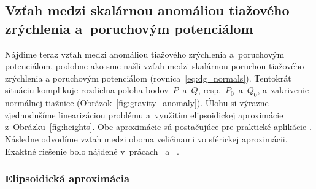 \documentclass[a4paper, 12pt]{book}
\begin{document}
\subsection{Vzťah medzi skalárnou anomáliou tiažového zrýchlenia a~poruchovým 
potenciálom}

Nájdime teraz vzťah medzi anomáliou tiažového zrýchlenia a~poruchovým 
potenciálom, podobne ako sme našli vzťah medzi skalárnou poruchou tiažového 
zrýchlenia a poruchovým potenciálom (rovnica~\ref{eq:dg_normals}).  Tentokrát 
situáciu komplikuje rozdielna poloha bodov~$P$~a~$Q$, resp.~$P_0$~a~$Q_0$, 
a~zakrivenie normálnej tiažnice (Obrázok~\ref{fig:gravity_anomaly}).  Úlohu si 
výrazne zjednodušíme linearizáciou problému a~využitím elipsoidickej 
aproximácie z~Obrázku~\ref{fig:heights}.  Obe aproximácie sú postačujúce pre 
praktické aplikácie \parencite{MoritzAdvancedGeodesy}.  Následne odvodíme vzťah 
medzi oboma veličinami vo sférickej aproximácii.  Exaktné riešenie bolo nájdené 
v~prácach~\textcite{Meissl1971b} a~\textcite{Borre_chapter8} \parencite[pozri 
tiež napríklad][]{MoritzAdvancedGeodesy,Janak2006}.

\subsubsection{Elipsoidická aproximácia}
\end{document}
